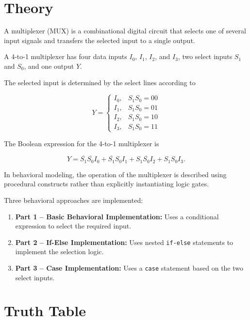 \documentclass[12pt,a4paper]{report}
\begin{document}
\section{Theory}

A multiplexer (MUX) is a combinational digital circuit that selects one of several input signals and transfers the selected input to a single output.

A 4-to-1 multiplexer has four data inputs $I_0$, $I_1$, $I_2$, and $I_3$, two select inputs $S_1$ and $S_0$, and one output $Y$.

The selected input is determined by the select lines according to

\[
Y =
\begin{cases}
I_0, & S_1S_0 = 00 \\
I_1, & S_1S_0 = 01 \\
I_2, & S_1S_0 = 10 \\
I_3, & S_1S_0 = 11
\end{cases}
\]

The Boolean expression for the 4-to-1 multiplexer is

\[
Y = \overline{S_1}\overline{S_0}I_0
+ \overline{S_1}S_0I_1
+ S_1\overline{S_0}I_2
+ S_1S_0I_3.
\]

In behavioral modeling, the operation of the multiplexer is described using procedural constructs rather than explicitly instantiating logic gates.

Three behavioral approaches are implemented:

\begin{enumerate}
    \item \textbf{Part 1 -- Basic Behavioral Implementation:} Uses a conditional expression to select the required input.
    \item \textbf{Part 2 -- If-Else Implementation:} Uses nested \texttt{if-else} statements to implement the selection logic.
    \item \textbf{Part 3 -- Case Implementation:} Uses a \texttt{case} statement based on the two select inputs.
\end{enumerate}

\section{Truth Table}
\end{document}
